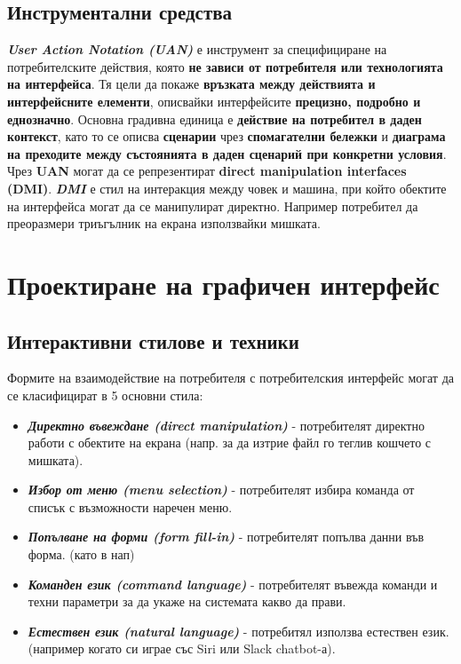 \documentclass[fleqn,12pt]{article}
\begin{document}
\subsection{Инструментални средства}

\textit{\textbf{User Action Notation (UAN)}} е инструмент за специфициране на потребителските действия, която \textbf{не зависи от потребителя или технологията на интерфейса}.
Тя цели да покаже \textbf{връзката между действията и интерфейсните елементи}, описвайки интерфейсите \textbf{прецизно, подробно и еднозначно}.
\bigbreak
Основна градивна единица е \textbf{действие на потребител в даден контекст}, като то се описва \textbf{сценарии} чрез \textbf{спомагателни бележки} и \textbf{диаграма на преходите между състоянията в даден сценарий при конкретни условия}. 
\bigbreak
Чрез \textbf{UAN} могат да се репрезентират \textbf{direct manipulation interfaces (DMI)}.
\textit{\textbf{DMI}} е стил на интеракция между човек и машина, при който обектите на интерфейса могат да се манипулират директно.
Например потребител да преоразмери триъгълник на екрана използвайки мишката.

\section{Проектиране на графичен интерфейс}

\subsection{Интерактивни стилове и техники}

Формите на взаимодействие на потребителя с потребителския интерфейс могат да се класифицират в 5 основни стила:
\begin{itemize}
    \item \textbf{\textit{Директно въвеждане (direct manipulation)}} - потребителят директно работи с обектите на екрана (напр. за да изтрие файл го теглив кошчето с мишката).
    \item \textbf{\textit{Избор от меню (menu selection)}} - потребителят избира команда от списък с възможности наречен меню.
    \item \textbf{\textit{Попълване на форми (form fill-in)}} - потребителят попълва данни във форма. (като в нап)
    \item \textbf{\textit{Команден език (command language)}} - потребителят въвежда команди и техни параметри за да укаже на системата какво да прави.
    \item \textbf{\textit{Естествен език (natural language)}} - потребитял използва естествен език. (например когато си играе със Siri или Slack chatbot-а).
\end{itemize}
\end{document}
